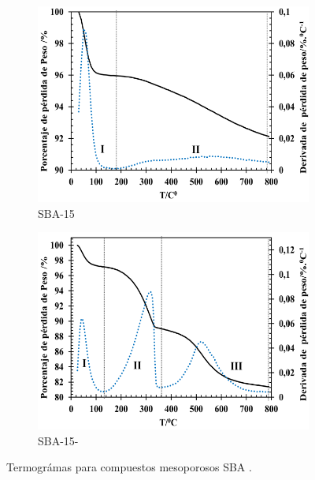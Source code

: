 \documentclass[fleqn, 12pt]{SelfArx}
\begin{document}
\begin{figure}[ht]
	\centering
	\begin{subfigure}[b]{0.45\textwidth}
		\includegraphics[width=\linewidth]{structures/TGA-normal.png}
		\caption{SBA-15}
		\label{fig: TGA-normal}
	\end{subfigure}
	\begin{subfigure}[b]{0.45\textwidth}
		\includegraphics[width=\linewidth]{structures/TGA-NH2.png}
		\caption{SBA-15-}
		\label{fig: TGA-NH2}
	\end{subfigure}    
	\caption{Termogr\'amas para compuestos mesoporosos SBA \cite{rodriguez}.}
\end{figure}
\end{document}

